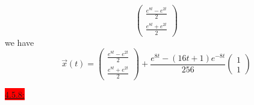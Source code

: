 \documentclass{exam}
\begin{document}
\begin{solution}
\[\begin{pmatrix}
            \frac{e^{8t} - e^{2t}}{2} \\
            \frac{e^{8t} + e^{2t}}{2}
        \end{pmatrix}
    \]
    we have 
    \[
        \boxed{
            \vec{x}(t) = \begin{pmatrix}
            \frac{e^{8t} - e^{2t}}{2} \\
            \frac{e^{8t} + e^{2t}}{2}
        \end{pmatrix} + \frac{e^{8t} - (16t + 1)e^{-8t}}{256}\begin{pmatrix}
            1 \\ 1
        \end{pmatrix}
        }
    \]
\end{solution}

\colorbox{red}{\underline{4.5.8:}}
\begin{solution}
    \begin{parts}

\end{parts}
\end{solution}
\end{document}
